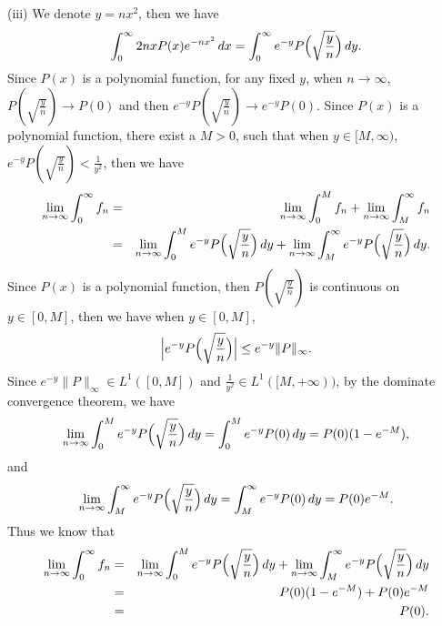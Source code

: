 \documentclass[12pt,a4paper]{ctexart}
\begin{document}
(iii) We denote $y = n x^{2}$, then we have
\begin{equation*}
    \int_{0}^{\infty} 2 n x P(x) e^{- n x^{2}} \, d x = \int_{0}^{\infty} e^{-y} P \Big{(} \sqrt{\frac{y}{n}} \Big{)} \, d y.
\end{equation*}
Since $P(x)$ is a polynomial function, for any fixed $y$, when $n \to \infty$, $P(\sqrt{\frac{y}{n}}) \to P(0)$ and then $e^{-y} P(\sqrt{\frac{y}{n}}) \to e^{-y} P(0)$. Since $P(x)$ is a polynomial function, there exist a $M > 0$, such that when $y \in [M, \infty)$, $e^{-y} P(\sqrt{\frac{y}{n}}) < \frac{1}{y^{2}}$, then we have
\begin{eqnarray*}
\lim_{n \to \infty} \int_{0}^{\infty} f_{n} & = & \lim_{n \to \infty} \int_{0}^{M} f_{n} + \lim_{n \to \infty} \int_{M}^{\infty} f_{n} \\
& = & \lim_{n \to \infty} \int_{0}^{M} e^{-y} P \Big{(} \sqrt{\frac{y}{n}} \Big{)} \, d y + \lim_{n \to \infty} \int_{M}^{\infty} e^{-y} P \Big{(} \sqrt{\frac{y}{n}} \Big{)} \, d y .
\end{eqnarray*}
Since $P(x)$ is a polynomial function, then $P(\sqrt{\frac{y}{n}})$ is continuous on $y \in [0,M]$, then we have when $y \in [0, M]$,
\begin{equation*}
    \Big{|} e^{-y} P \Big{(} \sqrt{\frac{y}{n}} \Big{)} \Big{|} \leq e^{-y} \|P\|_{\infty}.
\end{equation*}
Since $e^{-y} \|P\|_{\infty} \in L^{1}([0, M])$ and $\frac{1}{y^{2}} \in L^{1}([M, + \infty))$, by the dominate convergence theorem, we have
\begin{equation*}
    \lim_{n \to \infty} \int_{0}^{M} e^{-y} P \Big{(} \sqrt{\frac{y}{n}} \Big{)} \, d y = \int_{0}^{M} e^{-y} P(0) \, d y = P(0) (1 - e^{- M}),
\end{equation*}
and
\begin{equation*}
    \lim_{n \to \infty} \int_{M}^{\infty} e^{-y} P \Big{(} \sqrt{\frac{y}{n}} \Big{)} \, d y = \int_{M}^{\infty} e^{-y} P(0) \, d y = P(0) e^{- M}.
\end{equation*}
Thus we know that
\begin{eqnarray*}
\lim_{n \to \infty} \int_{0}^{\infty} f_{n} & = &  \lim_{n \to \infty} \int_{0}^{M} e^{-y} P \Big{(} \sqrt{\frac{y}{n}} \Big{)} \, d y + \lim_{n \to \infty} \int_{M}^{\infty} e^{-y} P \Big{(} \sqrt{\frac{y}{n}} \Big{)} \, d y \\
& = & P(0) (1 - e^{- M}) + P(0) e^{- M} \\
& = & P(0).
\end{eqnarray*}
\end{document}
